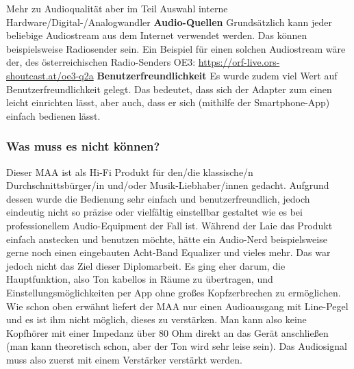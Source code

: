 \documentclass[11pt, twoside]{article}
\begin{document}
Mehr zu Audioqualität aber im Teil \glqq Auswahl interne Hardware/Digital-/Analogwandler\grqq{}
\vspace{4mm} \newline
\parencite[vgl.][]{noauthor_urlnl03_nodate}
\parencite[vgl.][]{noauthor_urlnl04_nodate}
\vspace{4mm}\newline
\textbf{Audio-Quellen}\newline
Grundsätzlich kann jeder beliebige Audiostream aus dem Internet verwendet werden. Das können beispielsweise Radiosender sein.
Ein Beispiel für einen solchen Audiostream wäre der, des österreichischen Radio-Senders \glqq OE3\grqq{}: \newline
\url{https://orf-live.ors-shoutcast.at/oe3-q2a}
\vspace{4mm}\newline
\textbf{Benutzerfreundlichkeit}\newline
Es wurde zudem viel Wert auf Benutzerfreundlichkeit gelegt. Das bedeutet, dass sich der Adapter zum einen leicht einrichten lässt, aber auch, dass er sich (mithilfe der Smartphone-App) einfach bedienen lässt.
\subsubsection{Was muss es nicht können?}
Dieser MAA ist als Hi-Fi Produkt für den/die klassische/n Durchschnittsbürger/in und/oder Musik-Liebhaber/innen gedacht. Aufgrund dessen wurde die Bedienung sehr einfach und benutzerfreundlich, jedoch eindeutig nicht so präzise oder vielfältig einstellbar gestaltet wie es bei professionellem Audio-Equipment der Fall ist. Während der Laie das Produkt einfach anstecken und benutzen möchte, hätte ein Audio-Nerd beispielsweise gerne noch einen eingebauten Acht-Band Equalizer und vieles mehr. Das war jedoch nicht das Ziel dieser Diplomarbeit. Es ging eher darum, die Hauptfunktion, also Ton kabellos in Räume zu übertragen, und Einstellungsmöglichkeiten per App ohne großes Kopfzerbrechen zu ermöglichen.\newline
Wie schon oben erwähnt liefert der MAA nur einen Audioausgang mit Line-Pegel und es ist ihm nicht möglich, dieses zu verstärken. Man kann also keine Kopfhörer mit einer Impedanz über 80 Ohm direkt an das Gerät anschließen (man kann theoretisch schon, aber der Ton wird sehr leise sein). Das Audiosignal muss also zuerst mit einem Verstärker verstärkt werden.\newline
\end{document}
